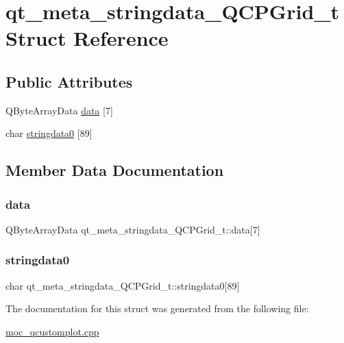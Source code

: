 \hypertarget{structqt__meta__stringdata__QCPGrid__t}{}\section{qt\+\_\+meta\+\_\+stringdata\+\_\+\+Q\+C\+P\+Grid\+\_\+t Struct Reference}
\label{structqt__meta__stringdata__QCPGrid__t}
\subsection*{Public Attributes}
\begin{DoxyCompactItemize}
\item 
Q\+Byte\+Array\+Data \mbox{\hyperlink{structqt__meta__stringdata__QCPGrid__t_ad7520be1ee34a662890da1cb1384cf28}{data}} \mbox{[}7\mbox{]}
\item 
char \mbox{\hyperlink{structqt__meta__stringdata__QCPGrid__t_a125926539385574413c9ff82323a34ca}{stringdata0}} \mbox{[}89\mbox{]}
\end{DoxyCompactItemize}


\subsection{Member Data Documentation}
\mbox{\label{structqt__meta__stringdata__QCPGrid__t_ad7520be1ee34a662890da1cb1384cf28}} 
\subsubsection{\texorpdfstring{data}{data}}
{\footnotesize\ttfamily Q\+Byte\+Array\+Data qt\+\_\+meta\+\_\+stringdata\+\_\+\+Q\+C\+P\+Grid\+\_\+t\+::data\mbox{[}7\mbox{]}}

\mbox{\label{structqt__meta__stringdata__QCPGrid__t_a125926539385574413c9ff82323a34ca}} 
\subsubsection{\texorpdfstring{stringdata0}{stringdata0}}
{\footnotesize\ttfamily char qt\+\_\+meta\+\_\+stringdata\+\_\+\+Q\+C\+P\+Grid\+\_\+t\+::stringdata0\mbox{[}89\mbox{]}}



The documentation for this struct was generated from the following file\+:\begin{DoxyCompactItemize}
\item 
\mbox{\hyperlink{moc__qcustomplot_8cpp}{moc\+\_\+qcustomplot.\+cpp}}\end{DoxyCompactItemize}

